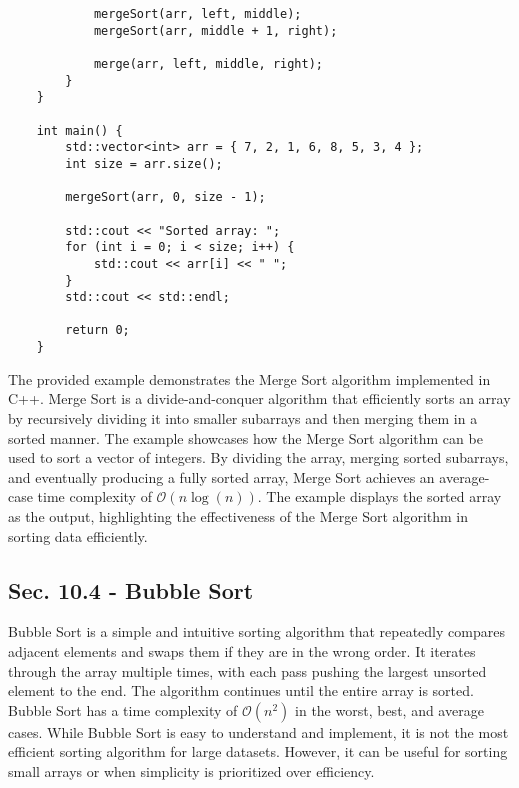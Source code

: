 \begin{solution}
\begin{verbatim}
            mergeSort(arr, left, middle);
            mergeSort(arr, middle + 1, right);
    
            merge(arr, left, middle, right);
        }
    }
    
    int main() {
        std::vector<int> arr = { 7, 2, 1, 6, 8, 5, 3, 4 };
        int size = arr.size();
    
        mergeSort(arr, 0, size - 1);
    
        std::cout << "Sorted array: ";
        for (int i = 0; i < size; i++) {
            std::cout << arr[i] << " ";
        }
        std::cout << std::endl;
    
        return 0;
    }
    \end{verbatim}

    \horizontalline

    The provided example demonstrates the Merge Sort algorithm implemented in C++. Merge Sort is a divide-and-conquer algorithm that efficiently sorts an array by recursively dividing it into smaller subarrays and then merging them in a sorted manner. The example showcases how the Merge Sort algorithm can be used to sort a vector of integers. 
    By dividing the array, merging sorted subarrays, and eventually producing a fully sorted array, Merge Sort achieves an average-case time complexity of $\mathcal{O}(n\log{(n)})$. The example displays the sorted array as the output, highlighting the effectiveness of the Merge Sort algorithm in sorting data efficiently.
\end{solution}

\subsection*{Sec. 10.4 - Bubble Sort}

Bubble Sort is a simple and intuitive sorting algorithm that repeatedly compares adjacent elements and swaps them if they are in the wrong order. It iterates through the array multiple times, with each pass pushing the largest unsorted element to the end. The algorithm continues until the entire array is sorted. Bubble Sort has a time complexity of 
$\mathcal{O}(n^2)$ in the worst, best, and average cases. While Bubble Sort is easy to understand and implement, it is not the most efficient sorting algorithm for large datasets. However, it can be useful for sorting small arrays or when simplicity is prioritized over efficiency.

